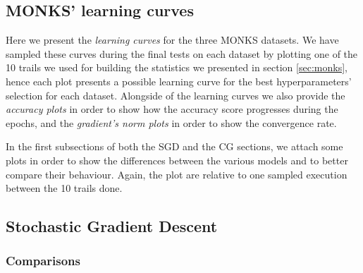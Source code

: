 \begin{appendices}
    \chapter{MONKS' learning curves} %
    \label{cha:monks_learning_curves}
        Here we present the \textit{learning curves} for the three MONKS datasets. We have sampled these curves
        during the final tests on each dataset by plotting one of the 10 trails we used for building the
        statistics we presented in section \ref{sec:monks}, hence each plot presents a possible learning curve
        for the best hyperparameters' selection for each dataset. Alongside of the learning curves
        we also provide the \textit{accuracy plots} in order to show how the accuracy score progresses
        during the epochs, and the \textit{gradient's norm plots} in order to show the convergence
        rate.

        In the first subsections of both the SGD and the CG sections, we attach some plots in order to show the differences between the various models and to better compare their behaviour.
        Again, the plot are relative to one sampled execution between the 10 trails done.

        \section{Stochastic Gradient Descent} %
        \label{sec:stochastic_gradient_descent}

            \subsection{Comparisons} %
            \label{sub:comparisons}


\end{appendices}

